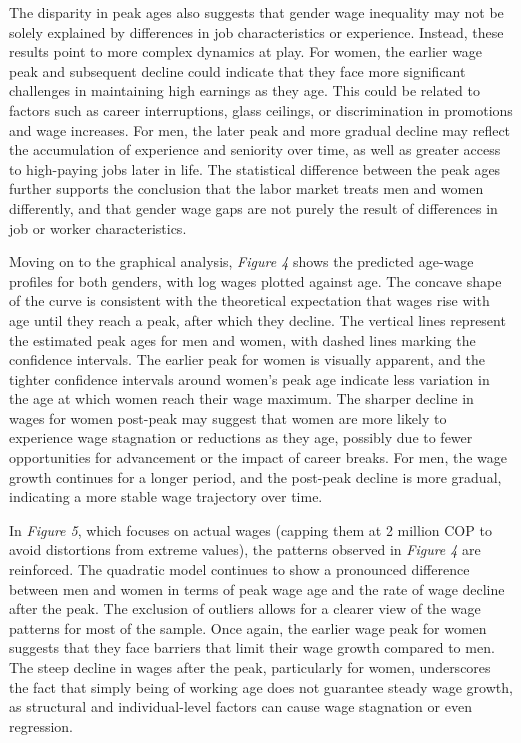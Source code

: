 \documentclass[11pt,a4paper,onecolumn]{article}
\begin{document}
        The disparity in peak ages also suggests that gender wage inequality may not be solely explained by differences in job characteristics or experience. Instead, these results point to more complex dynamics at play. For women, the earlier wage peak and subsequent decline could indicate that they face more significant challenges in maintaining high earnings as they age. This could be related to factors such as career interruptions, glass ceilings, or discrimination in promotions and wage increases. For men, the later peak and more gradual decline may reflect the accumulation of experience and seniority over time, as well as greater access to high-paying jobs later in life. The statistical difference between the peak ages further supports the conclusion that the labor market treats men and women differently, and that gender wage gaps are not purely the result of differences in job or worker characteristics.
        
        Moving on to the graphical analysis, \textit{Figure 4} shows the predicted age-wage profiles for both genders, with log wages plotted against age. The concave shape of the curve is consistent with the theoretical expectation that wages rise with age until they reach a peak, after which they decline. The vertical lines represent the estimated peak ages for men and women, with dashed lines marking the confidence intervals. The earlier peak for women is visually apparent, and the tighter confidence intervals around women’s peak age indicate less variation in the age at which women reach their wage maximum. The sharper decline in wages for women post-peak may suggest that women are more likely to experience wage stagnation or reductions as they age, possibly due to fewer opportunities for advancement or the impact of career breaks. For men, the wage growth continues for a longer period, and the post-peak decline is more gradual, indicating a more stable wage trajectory over time.
        
        In \textit{Figure 5}, which focuses on actual wages (capping them at 2 million COP to avoid distortions from extreme values), the patterns observed in \textit{Figure 4} are reinforced. The quadratic model continues to show a pronounced difference between men and women in terms of peak wage age and the rate of wage decline after the peak. The exclusion of outliers allows for a clearer view of the wage patterns for most of the sample. Once again, the earlier wage peak for women suggests that they face barriers that limit their wage growth compared to men. The steep decline in wages after the peak, particularly for women, underscores the fact that simply being of working age does not guarantee steady wage growth, as structural and individual-level factors can cause wage stagnation or even regression.
        
\end{document}
